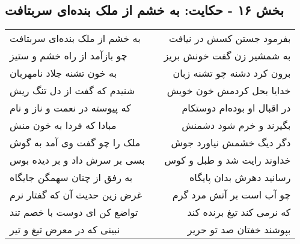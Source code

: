 \begin{center}
\section*{بخش ۱۶ - حکایت: به خشم از ملک بنده‌ای سربتافت}
\label{sec:016}
\begin{longtable}{l p{0.5cm} r}
به خشم از ملک بنده‌ای سربتافت
&&
بفرمود جستن کسش در نیافت
\\
چو بازآمد از راه خشم و ستیز
&&
به شمشیر زن گفت خونش بریز
\\
به خون تشنه جلاد نامهربان
&&
برون کرد دشنه چو تشنه زبان
\\
شنیدم که گفت از دل تنگ ریش
&&
خدایا بحل کردمش خون خویش
\\
که پیوسته در نعمت و ناز و نام
&&
در اقبال او بوده‌ام دوستکام
\\
مبادا که فردا به خون منش
&&
بگیرند و خرم شود دشمنش
\\
ملک را چو گفت وی آمد به گوش
&&
دگر دیگ خشمش نیاورد جوش
\\
بسی بر سرش داد و بر دیده بوس
&&
خداوند رایت شد و طبل و کوس
\\
به رفق از چنان سهمگن جایگاه
&&
رسانید دهرش بدان پایگاه
\\
غرض زین حدیث آن که گفتار نرم
&&
چو آب است بر آتش مرد گرم
\\
تواضع کن ای دوست با خصم تند
&&
که نرمی کند تیغ برنده کند
\\
نبینی که در معرض تیغ و تیر
&&
بپوشند خفتان صد تو حریر
\\
\end{longtable}
\end{center}
